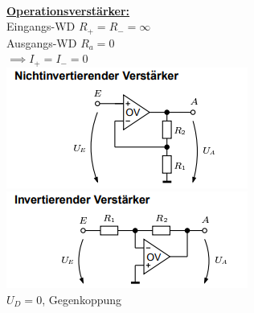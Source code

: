 \documentclass[8pt]{extarticle}
\begin{document}
~~~~~~
\begin{minipage}{0.33\textwidth}
\underline{\textbf{Operationsverstärker:}}\\
Eingangs-WD $R_+ = R_- = \infty$ \\
Ausgangs-WD $R_a = 0$ \\
$\implies I_+ = I_- = 0$ \\

\includegraphics[scale=0.40]{NIOV.png}
\includegraphics[scale=0.40]{IOV.png} \\
$U_D = 0$, Gegenkoppung\\


\end{minipage}
\end{document}
